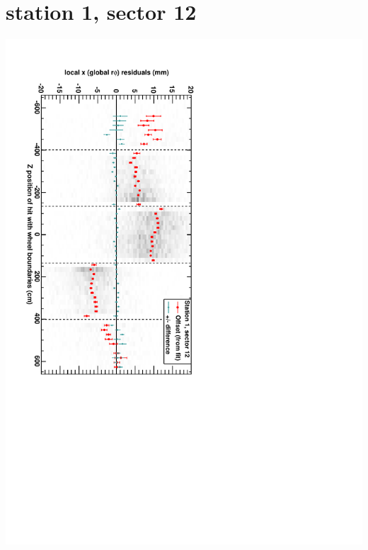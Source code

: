 \documentclass[compress]{beamer}
\begin{document}
\section*{station 1, sector 12}
\begin{frame} \vfill \mbox{\hspace{-1 cm}\includegraphics[height=1.2\linewidth, angle=90]{DTrphiVsZ_st1_sr12.pdf}} \end{frame}
\end{document}
